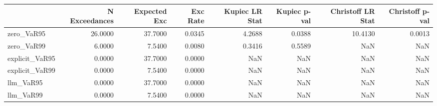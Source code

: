 \begin{tabular}{lrrrrrrr}
\toprule
 & N Exceedances & Expected Exc & Exc Rate & Kupiec LR Stat & Kupiec p-val & Christoff LR Stat & Christoff p-val \\
\midrule
zero_VaR95 & 26.0000 & 37.7000 & 0.0345 & 4.2688 & 0.0388 & 10.4130 & 0.0013 \\
zero_VaR99 & 6.0000 & 7.5400 & 0.0080 & 0.3416 & 0.5589 & NaN & NaN \\
explicit_VaR95 & 0.0000 & 37.7000 & 0.0000 & NaN & NaN & NaN & NaN \\
explicit_VaR99 & 0.0000 & 7.5400 & 0.0000 & NaN & NaN & NaN & NaN \\
llm_VaR95 & 0.0000 & 37.7000 & 0.0000 & NaN & NaN & NaN & NaN \\
llm_VaR99 & 0.0000 & 7.5400 & 0.0000 & NaN & NaN & NaN & NaN \\
\bottomrule
\end{tabular}
